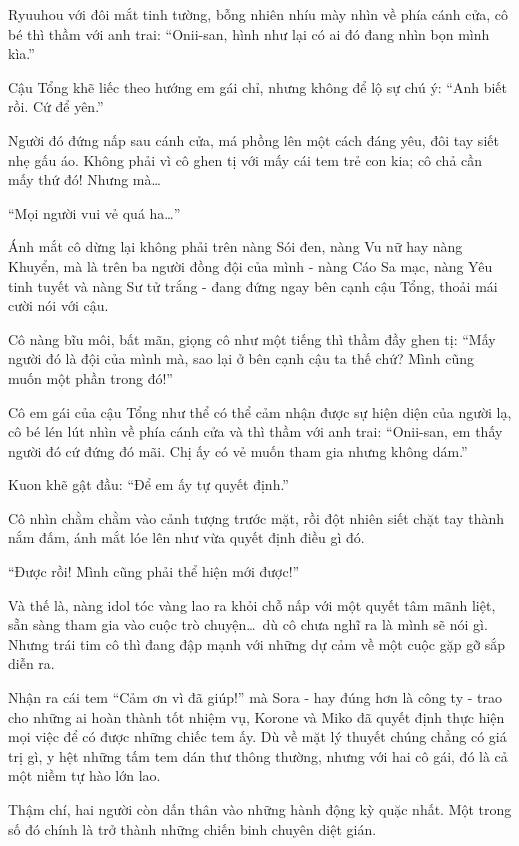 \documentclass[../main.tex]{subfiles}
\begin{document}
Ryuuhou với đôi mắt tinh tường, bỗng nhiên nhíu mày nhìn về phía cánh cửa, cô bé thì thầm với anh trai: ``Onii-san, hình như lại có ai đó đang nhìn bọn mình kìa.''

Cậu Tổng khẽ liếc theo hướng em gái chỉ, nhưng không để lộ sự chú ý: ``Anh biết rồi. Cứ để yên.''

Người đó đứng nấp sau cánh cửa, má phồng lên một cách đáng yêu, đôi tay siết nhẹ gấu áo. Không phải vì cô ghen tị với mấy cái tem trẻ con kia; cô chả cần mấy thứ đó! Nhưng mà\dots

``Mọi người vui vẻ quá ha\dots''

Ánh mắt cô dừng lại không phải trên nàng Sói đen, nàng Vu nữ hay nàng Khuyển, mà là trên ba người đồng đội của mình - nàng Cáo Sa mạc, nàng Yêu tinh tuyết và nàng Sư tử trắng - đang đứng ngay bên cạnh cậu Tổng, thoải mái cười nói với cậu.

Cô nàng bĩu môi, bất mãn, giọng cô như một tiếng thì thầm đầy ghen tị: ``Mấy người đó là đội của mình mà, sao lại ở bên cạnh cậu ta thế chứ? Mình cũng muốn một phần trong đó!''

Cô em gái của cậu Tổng như thể có thể cảm nhận được sự hiện diện của người lạ, cô bé lén lút nhìn về phía cánh cửa và thì thầm với anh trai: ``Onii-san, em thấy người đó cứ đứng đó mãi. Chị ấy có vẻ muốn tham gia nhưng không dám.''

Kuon khẽ gật đầu: ``Để em ấy tự quyết định.''

Cô nhìn chằm chằm vào cảnh tượng trước mặt, rồi đột nhiên siết chặt tay thành nắm đấm, ánh mắt lóe lên như vừa quyết định điều gì đó.

``Được rồi! Mình cũng phải thể hiện mới được!''

Và thế là, nàng idol tóc vàng lao ra khỏi chỗ nấp với một quyết tâm mãnh liệt, sẵn sàng tham gia vào cuộc trò chuyện\dots\ dù cô chưa nghĩ ra là mình sẽ nói gì. Nhưng trái tim cô thì đang đập mạnh với những dự cảm về một cuộc gặp gỡ sắp diễn ra.

\omk

Nhận ra cái tem ``Cảm ơn vì đã giúp!'' mà Sora - hay đúng hơn là công ty - trao cho những ai hoàn thành tốt nhiệm vụ, Korone và Miko đã quyết định thực hiện mọi việc để có được những chiếc tem ấy. Dù về mặt lý thuyết chúng chẳng có giá trị gì, y hệt những tấm tem dán thư thông thường, nhưng với hai cô gái, đó là cả một niềm tự hào lớn lao.

Thậm chí, hai người còn dấn thân vào những hành động kỳ quặc nhất. Một trong số đó chính là trở thành những chiến binh chuyên diệt gián.
\end{document}

